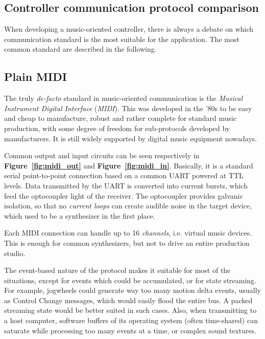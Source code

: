 \documentclass[a4paper,10pt]{article}
\newcommand{\citef}[1]{\textbf{Figure~\ref{#1}}}
\begin{document}
\begin{multicols}{2}
\section{Controller communication protocol comparison}
\label{sec:controller_protocols}

When developing a music-oriented controller, there is always a debate on which
communication standard is the most suitable for the application. The most
common standard are described in the following.


\subsection{Plain MIDI}

The truly \emph{de-facto} standard in music-oriented communication is the
\emph{Musical Instrument Digital Interface} (\emph{MIDI}). This was
developed in the '80s to be easy and cheap to manufacture, robust and rather
complete for standard music production, with some degree of freedom for
sub-protocols developed by manufacturers. It is still widely supported by
digital music equipment nowadays.

Common output and input circuits can be seen respectively in \citef{fig:midi_out}
and \citef{fig:midi_in}. Basically, it is a standard serial point-to-point
connection based on a common UART powered at TTL levels. Data transmitted by
the UART is converted into current bursts, which feed the optocoupler light of
the receiver. The optocoupler provides galvanic isolation, so that no
\emph{current loops} can create audible noise in the target device, which used
to be a synthesizer in the first place.

Each MIDI connection can handle up to 16 \emph{channels}, i.e. virtual music
devices. This is enough for common synthesizers, but not to drive an entire
production studio.

The event-based nature of the protocol makes it suitable for most of the
situations, except for events which could be accumulated, or for state
streaming. For example, jogwheels could generate way too many motion delta
events, usually as Control Change messages, which would easily flood the
entire bus. A packed streaming state would be better suited in such cases.
Also, when transmitting to a host computer, software buffers of its operating
system (often time-shared) can saturate while processing too many events at a
time, or complex sound textures.


\end{multicols}
\end{document}
